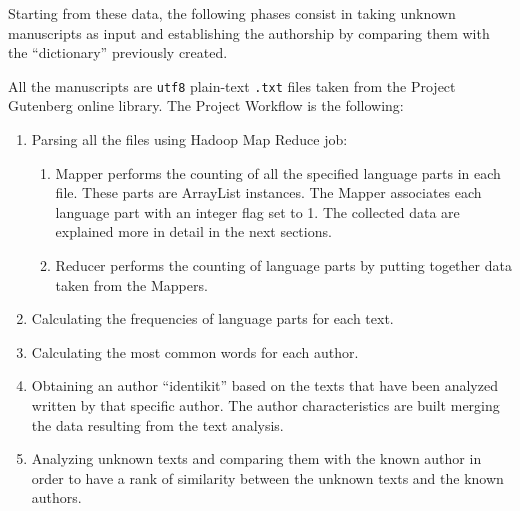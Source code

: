 \documentclass[a4paper,11pt, twoside]{article}
\begin{document}
	\noindent
	Starting from these data, the following phases consist in taking unknown manuscripts as input and establishing the authorship by comparing them with the ``dictionary'' previously created. 
	
	\noindent
	All the manuscripts are \texttt{utf8} plain-text \texttt{.txt} files taken from the Project Gutenberg \parencite{Gutenberg} online library.
	The Project Workflow is the following:
	\begin{enumerate}
		\item Parsing all the files using Hadoop Map Reduce job: 
		\begin{enumerate}
			\item Mapper performs the counting of all the specified language parts in each file. These parts are ArrayList instances. The Mapper associates each language part with an integer flag set to 1. The collected data are explained more in detail in the next sections. 
			
			\item Reducer performs the counting of language parts by putting together data taken from the Mappers.
		\end{enumerate}
		\item Calculating the frequencies of language parts for each text.
		\item Calculating the most common words for each author.
		\item Obtaining an author ``identikit'' based on the texts that have been analyzed written by that specific author. The author characteristics are built merging the data resulting from the text analysis.
		\item Analyzing unknown texts and comparing them with the known author in order to have a rank of similarity between the unknown texts and the known authors.
	\end{enumerate}
\end{document}
